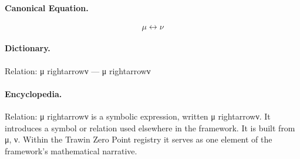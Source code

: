 \paragraph{Canonical Equation.}
\[
\mu\leftrightarrow\nu
\]

\paragraph{Dictionary.}
Relation: μ rightarrowν — μ rightarrowν

\paragraph{Encyclopedia.}
Relation: μ rightarrowν is a symbolic expression, written μ rightarrowν. It introduces a symbol or relation used elsewhere in the framework. It is built from μ, ν. Within the Trawin Zero Point registry it serves as one element of the framework's mathematical narrative.
